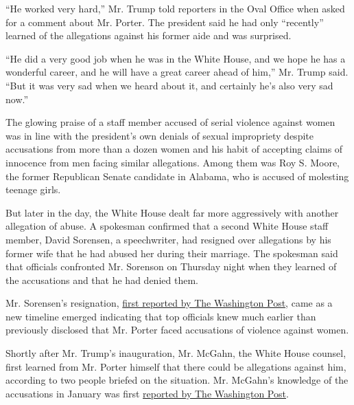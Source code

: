 ``He worked very hard,'' Mr. Trump told reporters in the Oval Office
when asked for a comment about Mr. Porter. The president said he had
only ``recently'' learned of the allegations against his former aide and
was surprised.

``He did a very good job when he was in the White House, and we hope he
has a wonderful career, and he will have a great career ahead of him,''
Mr. Trump said. ``But it was very sad when we heard about it, and
certainly he's also very sad now.''

The glowing praise of a staff member accused of serial violence against
women was in line with the president's own denials of sexual impropriety
despite accusations from more than a dozen women and his habit of
accepting claims of innocence from men facing similar allegations. Among
them was Roy S. Moore, the former Republican Senate candidate in
Alabama, who is accused of molesting teenage girls.

But later in the day, the White House dealt far more aggressively with
another allegation of abuse. A spokesman confirmed that a second White
House staff member, David Sorensen, a speechwriter, had resigned over
allegations by his former wife that he had abused her during their
marriage. The spokesman said that officials confronted Mr. Sorenson on
Thursday night when they learned of the accusations and that he had
denied them.

Mr. Sorensen's resignation,
\href{https://www.washingtonpost.com/politics/second-white-house-official-departs-amids-abuse-allegations-which-he-denies/2018/02/09/72ba47e6-0d0d-11e8-8b0d-891602206fb7_story.html?hpid=hp_rhp-top-table-main_sorensen-8pm\%3Ahomepage\%2Fstory\&utm_term=.ddcd0363c04f}{first
reported by The Washington Post}, came as a new timeline emerged
indicating that top officials knew much earlier than previously
disclosed that Mr. Porter faced accusations of violence against women.

Shortly after Mr. Trump's inauguration, Mr. McGahn, the White House
counsel, first learned from Mr. Porter himself that there could be
allegations against him, according to two people briefed on the
situation. Mr. McGahn's knowledge of the accusations in January was
first
\href{https://www.washingtonpost.com/politics/top-white-house-officials-knew-of-abuse-allegations-against-top-aide-for-months/2018/02/08/2faddcf2-0ce9-11e8-95a5-c396801049ef_story.html?hpid=hp_hp-top-table-low_whitehouse-1045pm:homepage/story\&utm_term=.0e674d9a3fb7}{reported
by The Washington Post}.

